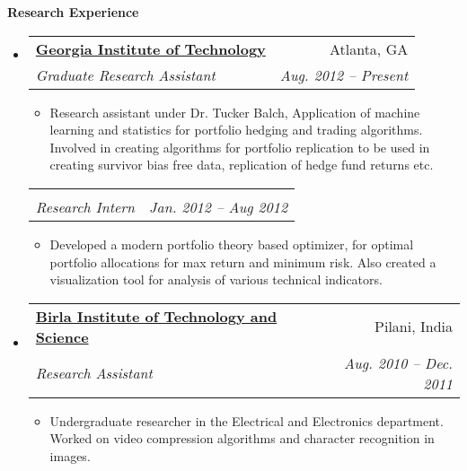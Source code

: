 \documentclass[letterpaper,9pt]{article}
\makeatletter
\newcommand{\resitem}[1]{\item #1 \vspace{-2pt}}
\newcommand{\resheading}[1]{{ \colorbox{mygrey}{\begin{minipage}{\textwidth}{\textbf{#1 \vphantom{p\^{E}}}}\end{minipage}}}}
\newcommand{\ressubheading}[4]{
\begin{tabular*}{6.5in}{l@{\extracolsep{\fill}}r}
        \textbf{#1} & #2 \\
        \textit{\small#3} & \textit{\small#4} \\
\end{tabular*}\vspace{-6pt}}
\makeatother
\begin{document}
\vspace{3pt}
\resheading{Research Experience}
	\vspace{-13pt}
	\begin{itemize}
		\item			
			\ressubheading{\href{https://www.gatech.edu}{Georgia Institute of Technology}}{Atlanta, GA}{Graduate Research Assistant}{Aug. 2012 -- Present}
				{ \small				
				\begin{itemize}
					\resitem{Research assistant under Dr. Tucker Balch, Application of machine learning and statistics for portfolio hedging and trading algorithms. Involved in creating algorithms for portfolio replication to be used in creating survivor bias free data, replication of hedge fund returns etc.}
				\end{itemize}
				}
			\vspace{-12pt}	
			\ressubheading{}{}{Research Intern}{Jan. 2012 -- Aug 2012}
				{ \small				
				\begin{itemize}
					\resitem{Developed a modern portfolio theory based optimizer, for optimal portfolio allocations for max return and minimum risk. Also created a visualization tool for analysis of various technical indicators.}
				\end{itemize}
				}
		\item 
			\ressubheading{\href{http://www.bits-pilani.ac.in}{Birla Institute of Technology and Science}}{Pilani, India}{Research Assistant}{Aug. 2010 -- Dec. 2011}
				{ \small
				\begin{itemize}
					\resitem{Undergraduate researcher in the Electrical and Electronics department. Worked on video compression algorithms and character recognition in images.
				\end{itemize}
				}

	}\end{itemize}  %
\end{document}
